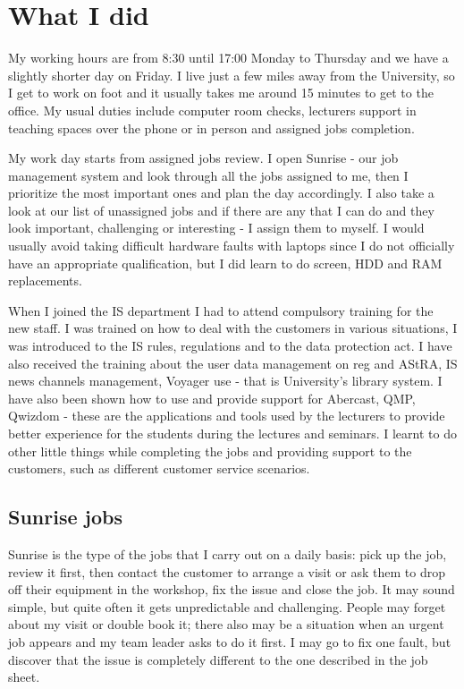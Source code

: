 \documentclass[10pt,a4paper,headinclude=true,twoside]{report}
\begin{document}
\chapter{What I did}
My working hours are from 8:30 until 17:00 Monday to Thursday and we have a slightly shorter day on Friday. I live just a few miles away from the University, so I get to work on foot and it usually takes me around 15 minutes to get to the office. My usual duties include computer room checks, lecturers support in teaching spaces over the phone or in person and assigned jobs completion.

My work day starts from assigned jobs review. I open Sunrise - our job management system and look through all the jobs assigned to me, then I prioritize the most important ones and plan the day accordingly. I also take a look at our list of unassigned jobs and if there are any that I can do and they look important, challenging or interesting - I assign them to myself. I would usually avoid taking difficult hardware faults with laptops since I do not officially have an appropriate qualification, but I did learn to do screen, HDD and RAM replacements. 

When I joined the IS department I had to attend compulsory training for the new staff. I was trained on how to deal with the customers in various situations, I was introduced to the IS rules, regulations and to the data protection act. I have also received the training about the user data management on reg and AStRA, IS news channels management, Voyager use - that is University's library system. I have also been shown how to use and provide support for Abercast, QMP, Qwizdom - these are the applications and tools used by the lecturers to provide better experience for the students during the lectures and seminars. I learnt to do other little things while completing the jobs and providing support to the customers, such as different customer service scenarios.

\section{Sunrise jobs}
Sunrise is the type of the jobs that I carry out on a daily basis: pick up the job, review it first, then contact the customer to arrange a visit or ask them to drop off their equipment in the workshop, fix the issue and close the job. It may sound simple, but quite often it gets unpredictable and challenging. People may forget about my visit or double book it; there also may be a situation when an urgent job appears and my team leader asks to do it first. I may go to fix one fault, but discover that the issue is completely different to the one described in the job sheet.
\end{document}
